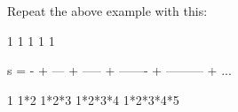 Repeat the above example with this:

\begin{console}

    1    1      1        1          1

s = - + --- + ----- + ------- + --------- + ...

    1   1*2   1*2*3   1*2*3*4   1*2*3*4*5

\end{console}

